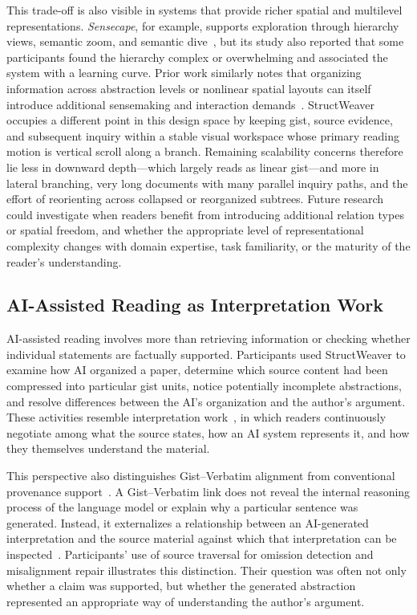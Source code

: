 \documentclass[manuscript,review,anonymous]{acmart}
\begin{document}
This trade-off is also visible in systems that provide richer spatial and multilevel representations. \textit{Sensecape}, for example, supports exploration through hierarchy views, semantic zoom, and semantic dive~\cite{sensecape}, but its study also reported that some participants found the hierarchy complex or overwhelming and associated the system with a learning curve. Prior work similarly notes that organizing information across abstraction levels or nonlinear spatial layouts can itself introduce additional sensemaking and interaction demands~\cite{pirolli2005sensemaking,liquidtext}. StructWeaver occupies a different point in this design space by keeping gist, source evidence, and subsequent inquiry within a stable visual workspace whose primary reading motion is vertical scroll along a branch. Remaining scalability concerns therefore lie less in downward depth---which largely reads as linear gist---and more in lateral branching, very long documents with many parallel inquiry paths, and the effort of reorienting across collapsed or reorganized subtrees. Future research could investigate when readers benefit from introducing additional relation types or spatial freedom, and whether the appropriate level of representational complexity changes with domain expertise, task familiarity, or the maturity of the reader's understanding.

\subsection{AI-Assisted Reading as Interpretation Work}

AI-assisted reading involves more than retrieving information or checking whether individual statements are factually supported. Participants used StructWeaver to examine how AI organized a paper, determine which source content had been compressed into particular gist units, notice potentially incomplete abstractions, and resolve differences between the AI's organization and the author's argument. These activities resemble interpretation work~\cite{supporting_or_hindering_chi26,thought_exchanges_iui,abstractexplorer}, in which readers continuously negotiate among what the source states, how an AI system represents it, and how they themselves understand the material.

This perspective also distinguishes Gist--Verbatim alignment from conventional provenance support~\cite{papertrail,kambhamettu2024traceabletextdeepeningreading}. A Gist--Verbatim link does not reveal the internal reasoning process of the language model or explain why a particular sentence was generated. Instead, it externalizes a relationship between an AI-generated interpretation and the source material against which that interpretation can be inspected~\cite{hollan2000distributed,pirolli2005sensemaking}. Participants' use of source traversal for omission detection and misalignment repair illustrates this distinction. Their question was often not only whether a claim was supported, but whether the generated abstraction represented an appropriate way of understanding the author's argument.
\end{document}
